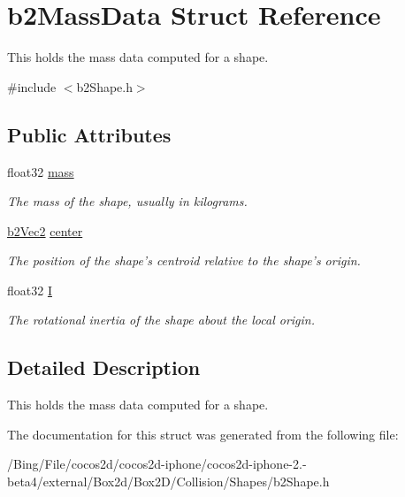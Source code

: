 \hypertarget{structb2_mass_data}{\section{b2\-Mass\-Data Struct Reference}
\label{structb2_mass_data}
}


This holds the mass data computed for a shape.  




{\ttfamily \#include $<$b2\-Shape.\-h$>$}

\subsection*{Public Attributes}
\begin{DoxyCompactItemize}
\item 
\hypertarget{structb2_mass_data_aea85d9595a38d2eed05b8d2ea80d97b1}{float32 \hyperlink{structb2_mass_data_aea85d9595a38d2eed05b8d2ea80d97b1}{mass}}\label{structb2_mass_data_aea85d9595a38d2eed05b8d2ea80d97b1}

\begin{DoxyCompactList}\small\item\em The mass of the shape, usually in kilograms. \end{DoxyCompactList}\item 
\hypertarget{structb2_mass_data_a1d59bebc7030c4dded0c2febc57ebdd7}{\hyperlink{structb2_vec2}{b2\-Vec2} \hyperlink{structb2_mass_data_a1d59bebc7030c4dded0c2febc57ebdd7}{center}}\label{structb2_mass_data_a1d59bebc7030c4dded0c2febc57ebdd7}

\begin{DoxyCompactList}\small\item\em The position of the shape's centroid relative to the shape's origin. \end{DoxyCompactList}\item 
\hypertarget{structb2_mass_data_ad2d06e96e2d79d895df16ae0e5fe0376}{float32 \hyperlink{structb2_mass_data_ad2d06e96e2d79d895df16ae0e5fe0376}{I}}\label{structb2_mass_data_ad2d06e96e2d79d895df16ae0e5fe0376}

\begin{DoxyCompactList}\small\item\em The rotational inertia of the shape about the local origin. \end{DoxyCompactList}\end{DoxyCompactItemize}


\subsection{Detailed Description}
This holds the mass data computed for a shape. 

The documentation for this struct was generated from the following file\-:\begin{DoxyCompactItemize}
\item 
/\-Bing/\-File/cocos2d/cocos2d-\/iphone/cocos2d-\/iphone-\/2.-\/beta4/external/\-Box2d/\-Box2\-D/\-Collision/\-Shapes/b2\-Shape.\-h\end{DoxyCompactItemize}
